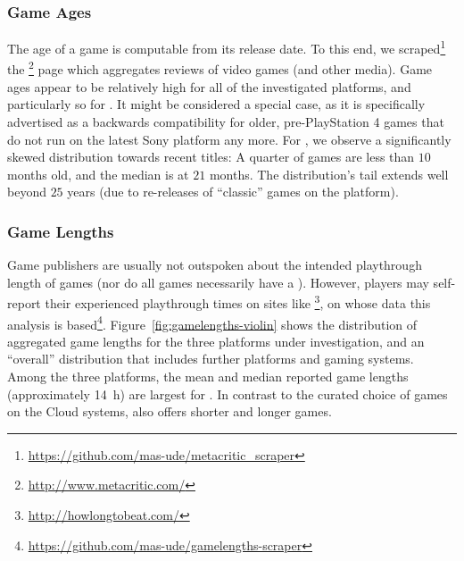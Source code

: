 \subsubsection{Game Ages}

The age of a game is computable from its release date. To this end, we scraped\footnote{\url{https://github.com/mas-ude/metacritic_scraper}} the \metacritic\footnote{\url{http://www.metacritic.com/}} page which aggregates reviews of video games (and other media). Game ages appear to be relatively high for all of the investigated platforms, and particularly so for \psnow. It might be considered a special case, as it is specifically advertised as a backwards compatibility for older, pre-PlayStation 4 games that do not run on the latest Sony platform any more. For \steam, we observe a significantly skewed distribution towards recent titles: A quarter of games are less than $10$ months old, and the median is at $21$ months. The distribution's tail extends well beyond $25$ years (due to re-releases of ``classic'' games on the platform).


\subsubsection{Game Lengths}

Game publishers are usually not outspoken about the intended playthrough length of games (nor do all games necessarily have a ). However, players may self-report their experienced playthrough times on sites like \hltb\footnote{\url{http://howlongtobeat.com/}}, on whose data this analysis is based\footnote{\url{https://github.com/mas-ude/gamelengths-scraper}}.
Figure~\ref{fig:gamelengths-violin} shows the distribution of aggregated game lengths for the three platforms under investigation, and an ``overall'' distribution that includes further platforms and gaming systems. Among the three platforms, the mean and median reported game lengths (approximately \SI{14}{\hour}) are largest for \gfnow. In contrast to the curated choice of games on the Cloud systems, \steam also offers shorter and longer games.



